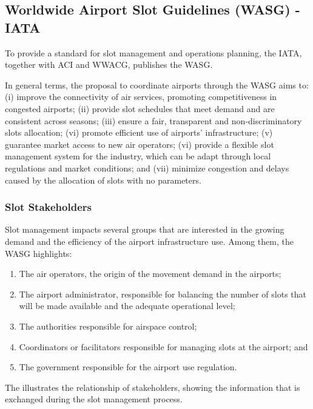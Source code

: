 \subsection{Worldwide Airport Slot Guidelines (\acrshort{WASG}) - \acrshort{IATA}}
To provide a standard for slot management and operations planning, the \acrshort{IATA}, together with \acrfull{ACI} and \acrfull{WWACG}, publishes the \acrshort{WASG}\cite{WASG2020}.

In general terms, the proposal to coordinate airports through the \acrshort{WASG} aims to: (i) improve the connectivity of air services, promoting competitiveness in congested airports; (ii) provide slot schedules that meet demand and are consistent across seasons; (iii) ensure a fair, transparent and non-discriminatory slots allocation; (vi) promote efficient use of airports’ infrastructure; (v) guarantee market access to new air operators; (vi) provide a flexible slot management system for the industry, which can be adapt through local regulations and market conditions; and (vii) minimize congestion and delays caused by the allocation of slots with no parameters.

\subsubsection{Slot Stakeholders}

Slot management impacts several groups that are interested in the growing demand and the efficiency of the airport infrastructure use. Among them, the \acrshort{WASG} highlights: 

\begin{enumerate}
	\item The air operators, the origin of the movement demand in the airports;
	\item The airport administrator, responsible for balancing the number of slots that will be made available and the adequate operational level;
	\item The authorities responsible for airspace control; 
	\item Coordinators or facilitators responsible for managing slots at the airport; and
        \item The government responsible for the airport use regulation.
\end{enumerate}%

The  illustrates the relationship of stakeholders, showing the information that is exchanged during the slot management process.

